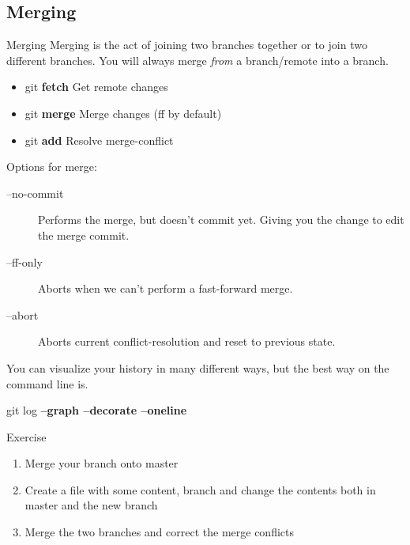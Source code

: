 \documentclass{beamer}
\begin{document}
\subsection{Merging}
\begin{frame}[fragile]{Merging}
Merging is the act of joining two branches together or to join two different branches. You will always merge \emph{from} a branch/remote into a branch.
  \begin{block}{}
    \begin{itemize}
      \item git \textbf{fetch}  Get remote changes
      \item git \textbf{merge}  Merge changes (ff by default)
      \item git \textbf{add}    Resolve merge-conflict
    \end{itemize}

    Options for merge:
    \begin{description}
      \item[--no-commit] Performs the merge, but doesn't commit yet. Giving you the change to edit the merge commit.
      \item[--ff-only]   Aborts when we can't perform a fast-forward merge.
      \item[--abort]     Aborts current conflict-resolution and reset to previous state.
    \end{description}
  \end{block}

  You can visualize your history in many different ways, but the best way on the command line is.\\
  \begin{block}{}
  git log \textbf{--graph --decorate --oneline}
  \end{block}
\end{frame}
\begin{frame}
  \begin{block}{Exercise}
    \begin{enumerate}
      \item Merge your branch onto master
      \item Create a file with some content, branch and change the contents both in master and the new branch
      \item Merge the two branches and correct the merge conflicts
    \end{enumerate}
  \end{block}
\end{frame}
\end{document}
